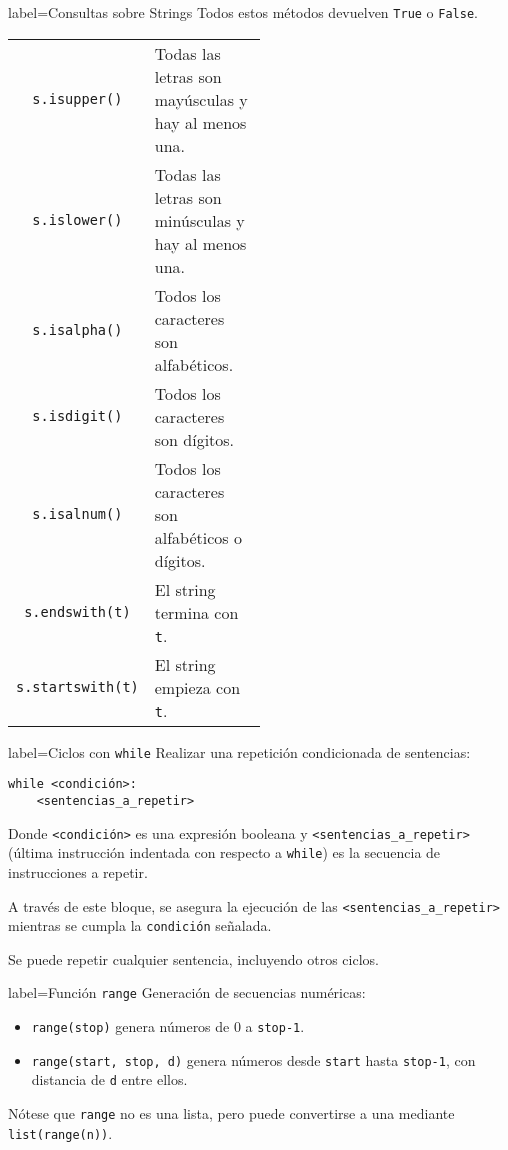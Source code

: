 \begin{contentbox}{label=Consultas sobre Strings}
    Todos estos métodos devuelven \texttt{True} o \texttt{False}.
    
    \begin{tabular}{C|p{0.5\linewidth}}
        \lstinline!s.isupper()! & Todas las letras son mayúsculas y hay al menos una. \\
        \lstinline!s.islower()! & Todas las letras son minúsculas y hay al menos una. \\
        \lstinline!s.isalpha()! & Todos los caracteres son alfabéticos. \\
        \lstinline!s.isdigit()! & Todos los caracteres son dígitos. \\
        \lstinline!s.isalnum()! & Todos los caracteres son alfabéticos o dígitos. \\
        \lstinline!s.endswith(t)! & El string termina con \texttt{t}. \\
        \lstinline!s.startswith(t)! & El string empieza con \texttt{t}.
    \end{tabular}
\end{contentbox}

\begin{contentbox}{label=Ciclos con \texttt{while}}
    Realizar una repetición condicionada de sentencias: 
\begin{lstlisting}
while <condición>:
    <sentencias_a_repetir>
\end{lstlisting}

    Donde \lstinline!<condición>! es una \alert{expresión booleana} y \lstinline!<sentencias_a_repetir>! (última instrucción indentada con respecto a \lstinline!while!) es la secuencia de instrucciones a repetir.
    
    A través de este bloque, se asegura la ejecución de las \lstinline!<sentencias_a_repetir>! mientras se cumpla la \lstinline!condición! señalada.
    
    Se puede repetir cualquier sentencia, incluyendo otros ciclos.
\end{contentbox}

\begin{contentbox}{label=Función \lstinline!range!}
    Generación de secuencias numéricas:
    \begin{itemize}
        \item \lstinline!range(stop)! genera números de 0 a \texttt{stop-1}.
        \item \lstinline!range(start, stop, d)! genera números desde \texttt{start} hasta \texttt{stop-1}, con distancia de \texttt{d} entre ellos.
    \end{itemize}
    
    Nótese que \lstinline!range! no es una lista, pero puede convertirse a una mediante \lstinline!list(range(n))!.
\end{contentbox}

